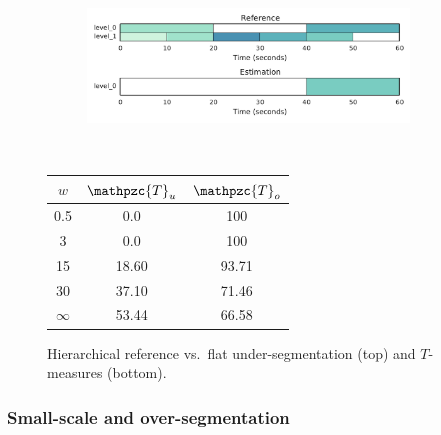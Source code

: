 \documentclass{article}
\def\shag{\ensuremath{\mathpzc{T}}}
\begin{document}
\begin{figure}
  \centering
  \begin{subfigure}{0.5\textwidth}
    \centering
    \includegraphics[width=0.94\textwidth]{figs/hier-flatlarger.pdf}
  \end{subfigure}%
  \\
  \begin{minipage}{0.5\textwidth}
    \centering
    \vspace{10pt}
    \begin{tabular}{|c|c|c|}
      \hline
      $w$       & $\shag_u$    & $\shag_o$      \\
      \hline
      0.5       & 0.0      & 100      \\     
      3         & 0.0      & 100      \\
      15        & 18.60     & 93.71    \\
      30        & 37.10     & 71.46    \\
      $\infty$  & 53.44     & 66.58    \\
      \hline
    \end{tabular}
  \end{minipage}
  \caption{Hierarchical reference vs.\ flat under-segmentation (top) and $T$-measures (bottom).}
  \label{fig:hier-flatlarger}
\end{figure}


\subsubsection{Small-scale and over-segmentation}
\end{document}
